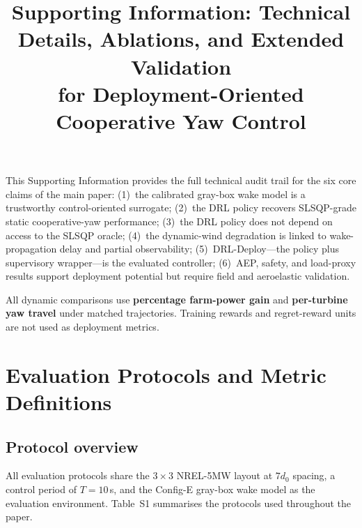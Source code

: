 \documentclass{article}
\begin{document}
\title{Supporting Information: Technical Details, Ablations, and Extended Validation\\ for Deployment-Oriented Cooperative Yaw Control}
\maketitle

This Supporting Information provides the full technical audit trail for the six core claims of the main paper:
(1)~the calibrated gray-box wake model is a trustworthy control-oriented surrogate;
(2)~the DRL policy recovers SLSQP-grade static cooperative-yaw performance;
(3)~the DRL policy does not depend on access to the SLSQP oracle;
(4)~the dynamic-wind degradation is linked to wake-propagation delay and partial observability;
(5)~DRL-Deploy---the policy plus supervisory wrapper---is the evaluated controller;
(6)~AEP, safety, and load-proxy results support deployment potential but require field and aeroelastic validation.

All dynamic comparisons use \textbf{percentage farm-power gain} and \textbf{per-turbine yaw travel} under matched trajectories. Training rewards and regret-reward units are not used as deployment metrics.

\section{Evaluation Protocols and Metric Definitions}\label{sec:protocols}

\subsection{Protocol overview}

All evaluation protocols share the $3{\times}3$ NREL-5MW layout at $7d_0$ spacing, a control period of $T{=}10$\,s, and the Config-E gray-box wake model as the evaluation environment. Table~S1 summarises the protocols used throughout the paper.
\end{document}
